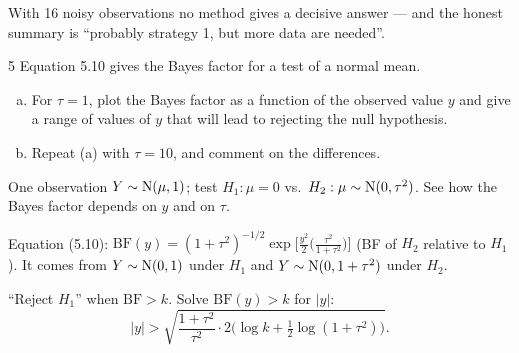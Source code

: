 \documentclass[11pt]{article}
\begin{document}
\begin{takeaway}
With 16 noisy observations no method gives a decisive answer --- and the honest summary is ``probably strategy 1, but more data are needed''.
\end{takeaway}


\begin{problem}{5}
Equation 5.10 gives the Bayes factor for a test of a normal mean.
\begin{enumerate}[(a)]
\item For $\tau=1$, plot the Bayes factor as a function of the observed value $y$ and give a range of values of $y$ that will lead to rejecting the null hypothesis.
\item Repeat (a) with $\tau=10$, and comment on the differences.
\end{enumerate}
\end{problem}

\begin{restate}
One observation $Y\sim\mathrm{N}(\mu,1)$; test $H_1:\mu=0$ vs.\ $H_2:\mu\sim\mathrm{N}(0,\tau^2)$. See how the Bayes factor depends on $y$ and on $\tau$.
\end{restate}

\begin{recall}
Equation (5.10): $\displaystyle\text{BF}(y)=(1+\tau^2)^{-1/2}\exp\Big[\frac{y^2}{2}\Big(\frac{\tau^2}{1+\tau^2}\Big)\Big]$ (BF of $H_2$ relative to $H_1$). It comes from $Y\sim\mathrm{N}(0,1)$ under $H_1$ and $Y\sim\mathrm{N}(0,1+\tau^2)$ under $H_2$.
\end{recall}

\begin{keyidea}
``Reject $H_1$'' when $\text{BF}>k$. Solve $\text{BF}(y)>k$ for $|y|$:
\[
|y|>\sqrt{\frac{1+\tau^2}{\tau^2}\cdot2\Big(\log k+\tfrac12\log(1+\tau^2)\Big)}.
\]
\end{keyidea}
\end{document}
